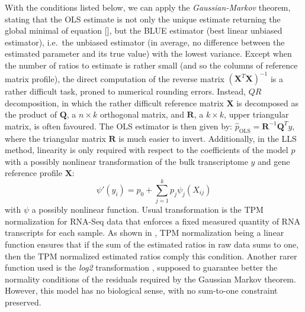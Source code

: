 With the conditions listed below, we can apply the
\emph{Gaussian-Markov} theorem, stating that the OLS estimate is not
only the unique estimate returning the global minimal of equation
{[}{]}, but the BLUE estimator (best linear unbiased estimator),
i.e.~the unbiased estimator (in average, no difference between the
estimated parameter and its true value) with the lowest variance. Except
when the number of ratios to estimate is rather small (and so the
columns of reference matrix profile), the direct computation of the
reverse matrix \((\boldsymbol{X}^T\boldsymbol{X})^{-1}\) is a rather difficult
task, proned to numerical rounding errors. Instead, \(QR\)
decomposition, in which the rather difficult reference matrix
\(\boldsymbol{X}\) is decomposed as the product of \(\mathbf{Q}\), a
\(n \times k\) orthogonal matrix, and \(\mathbf{R}\), a \(k \times k\),
upper triangular matrix, is often favoured. The OLS estimator is then
given by: \(\hat{p}_{\text{OLS}} = \mathbf{R}^{-1} \mathbf{Q}^T y\),
where the triangular matrix \(\mathbf{R}\) is much easier to invert.
Additionally, in the LLS method, linearity is only required with respect
to the coefficients of the model \(p\) with a possibly nonlinear
transformation of the bulk transcriptome \(y\) and gene reference
profile \(\boldsymbol{X}\): \[
\psi'(y_i)= p_0 + \sum_{j=1}^k p_j \psi_j(X_{ij})
\] with \(\psi\) a possibly nonlinear function. Usual transformation is
the TPM normalization for \acrshort{RNA-Seq} data that enforces a fixed measured
quantity of RNA transcripts for each sample. As shown in
\autocite{racle_etal17}, TPM
normalization being a linear function ensures that if the sum of the
estimated ratios in raw data sums to one, then the TPM normalized
estimated ratios comply this condition. Another rarer function used is
the \emph{log2} transformation
\autocite{hoffmann_etal06},
supposed to guarantee better the normality conditions of the residuals
required by the Gaussian Markov theorem. However, this model has no
biological sense, with no sum-to-one constraint preserved.

